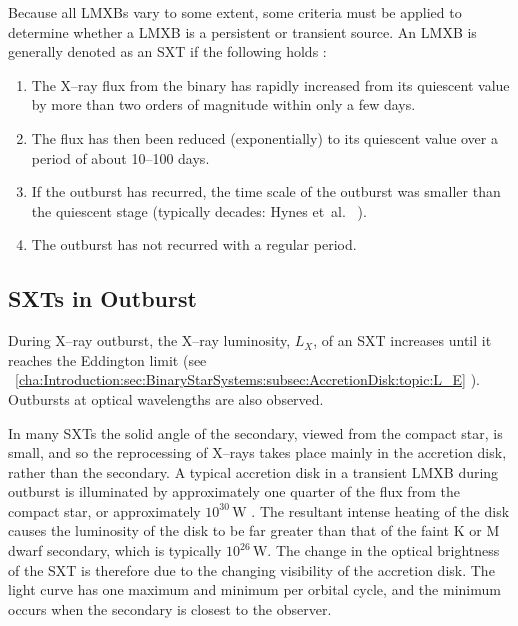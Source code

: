 Because all LMXBs vary to some extent, some criteria must be applied to determine whether a LMXB is a persistent or transient source. An LMXB is generally denoted as an SXT if the following holds %
\cite{TanakaShibazaki:1996}:
\begin{enumerate}
\item 
\label{cha:Introduction:sec:X--rayBinaries:subsec:CriteriaForSXTs:enu:flux}
The X--ray flux from the binary has rapidly increased from its quiescent
value by more than two orders of magnitude within only a few days.
\item 
\label{cha:Introduction:sec:X--rayBinaries:subsec:CriteriaForSXTs:enu:reduction}
The flux has then been reduced (exponentially) to its quiescent value
over a period of about 10--100 days.
\item 
\label{cha:Introduction:sec:X--rayBinaries:subsec:CriteriaForSXTs:enu:outburst}
If the outburst has recurred, the time scale of the outburst was
smaller than the quiescent stage (typically decades: Hynes et~al.\ %
). %
\item 
\label{cha:Introduction:sec:X--rayBinaries:subsec:CriteriaForSXTs:enu:recur}
The outburst has not recurred with a regular period.
\end{enumerate}


\subsection{SXTs in Outburst}
\label{cha:Introduction:sec:X--rayBinaries:subsec:Outburst}

During X--ray outburst, the X--ray luminosity, $L_X$, of an SXT increases until it reaches
the Eddington limit (see%
\ \vref{cha:Introduction:sec:BinaryStarSystems:subsec:AccretionDisk:topic:L_E}%
). Outbursts at optical wavelengths are also observed.%

\vspace{\myparskip}

In many SXTs the solid angle of the secondary, viewed from the compact star, is small, and so the reprocessing
of X--rays takes place mainly in the accretion disk, rather than the secondary. A typical accretion disk in a transient LMXB during outburst is illuminated by approximately one quarter of the
flux from the compact star, or approximately
$10^{30}\,\mathrm{W}$ %
\cite{VanParadijsMcClintock:1995}. %
The resultant intense heating of the disk causes the luminosity of the
disk to be far greater than that of the faint K or M dwarf secondary,
which is typically $10^{26}\,\mathrm{W}$. %
The change in the optical brightness of the SXT is therefore due to the changing
visibility of the accretion disk. The light curve has one maximum and minimum per orbital
cycle, and the minimum occurs when the secondary is closest to the
observer. %

